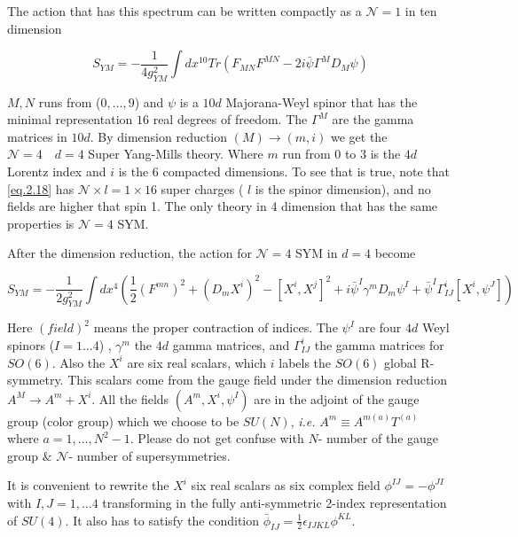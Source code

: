 	
The action that has this spectrum can be written compactly as a $\mathcal{N} = 1$ in ten dimension

\begin{equation}
S_{YM} = -\frac{1}{4g_{YM}^{2}}  \int dx^{10} Tr \left(F_{MN}F^{MN}  -2i\bar{\psi} \Gamma^{M}D_{M}\psi \right)
\label{eq.2.18}
\end{equation}
	

$M,N$ runs from ($0,\dots ,9$) and $\psi$ is a $10d$ Majorana-Weyl spinor that has the minimal representation $16$ real degrees of freedom. The $\Gamma^{M}$ are the gamma matrices in $10d$. By dimension reduction $(M) \rightarrow (m,i)$ we get the $\mathcal{N} =4 \quad d=4$ Super Yang-Mills theory. Where $m$ run from $0$ to $3$ is the $4d$ Lorentz index and $i$ is the $6$ compacted dimensions. To see that is true, note that  \eqref{eq.2.18} has $\mathcal{N} \times l = 1 \times 16$ super charges ( $l$ is the spinor dimension), and no fields are higher that spin 1. The only theory  in 4 dimension that has the same properties is $\mathcal{N} =4$ SYM. 

After the dimension reduction, the action for $\mathcal{N} = 4$ SYM in $d=4$ become 


\begin{equation}
S_{YM} = - \frac{1}{2g_{YM}^{2}} \int dx^{4} \left( \frac{1}{2}(F^{mn})^{2} + (D_{m}X^{i})^{2} -[X^{i},X^{j}]^{2} + i\bar{\psi}^{I}\gamma^{m}D_{m}\psi^{I} +  \bar{\psi}^{I}\Gamma^{i}_{IJ}[X^{i},\psi^{J}]  \right)  
\end{equation}

Here $(field)^{2}$ means the proper contraction of indices. The $\psi^{I} $ are four $4d$ Weyl spinors ($I = 1 \dots 4$) , $\gamma^{m}$  the $4d$ gamma matrices, and $\Gamma^{i}_{IJ}$ the gamma matrices for $SO(6)$. Also the $X^{i}$ are six real scalars, which $i$ labels the $SO(6)$ global R-symmetry. This scalars come from the gauge field under the dimension reduction $A^{M} \rightarrow A^{m} + X^{i}$. All the fields $(A^{m},X^{i},\psi^{I})$ are in the adjoint of the gauge group (color group) which we choose to be $SU(N)$, \textit{i.e.} $A^{m} \equiv A^{m(a)}T^{(a)}$ where $a = 1, \dots ,N^{2}-1$. Please do not get confuse with $N$- number of the gauge group $\&$ $\mathcal{N}$- number of supersymmetries.


It is convenient to rewrite the $X^{i}$ six real scalars as six complex field $\phi^{IJ}= -\phi^{JI}$ with $I,J = 1,\dots 4$ transforming in the fully anti-symmetric 2-index representation of $SU(4)$. It also has to satisfy the condition $\bar{\phi}_{IJ} =\frac{1}{2}\epsilon_{IJKL}\phi^{KL}  $. 

